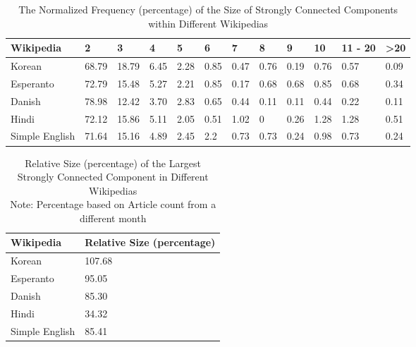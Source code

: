 \documentclass[twoside]{article}
\begin{document}
\begin{table}[h]

\caption{The Normalized Frequency (percentage) of the Size of Strongly Connected Components within Different Wikipedias}

\centering

\begin{tabular}{| l | l | l | l | l | l |  l | l | l | l | l | l | }

\hline

Wikipedia & 2 & 3 & 4 & 5 & 6 & 7 & 8 & 9 & 10 & {11 - 20} & >20 \\ \hline

Korean & 68.79 & 18.79 & 6.45 & 2.28 & 0.85 & 0.47 & 0.76 & 0.19 & 0.76 & 0.57 & 0.09 \\ \hline

Esperanto & 72.79 & 15.48 & 5.27 & 2.21 & 0.85 & 0.17 & 0.68 & 0.68 & 0.85 & 0.68 & 0.34 \\ \hline

Danish & 78.98 & 12.42 & 3.70 & 2.83 & 0.65 & 0.44 & 0.11 & 0.11 & 0.44 & 0.22 & 0.11 \\ \hline

Hindi & 72.12 & 15.86 & 5.11 & 2.05 & 0.51 & 1.02 & 0 & 0.26 & 1.28  & 1.28 & 0.51 \\ \hline

Simple English & 71.64  & 15.16 & 4.89 & 2.45 & 2.2 & 0.73 & 0.73 & 0.24 & 0.98 & 0.73 & 0.24 \\ \hline

\end{tabular}

\end{table}


\begin{table}[h]
\centering

\caption{Relative Size (percentage) of the Largest Strongly Connected Component in Different Wikipedias \\
	Note: Percentage based on Article count from a different month}

\begin{tabular}{| l | l |}

\hline

Wikipedia & Relative Size (percentage)   \\ \hline

Korean & 107.68 \\ \hline

Esperanto &  95.05  \\ \hline

Danish &  85.30 \\ \hline

Hindi & 34.32 \\ \hline

Simple English & 85.41  \\ \hline

\end{tabular}

\end{table}
\end{document}
